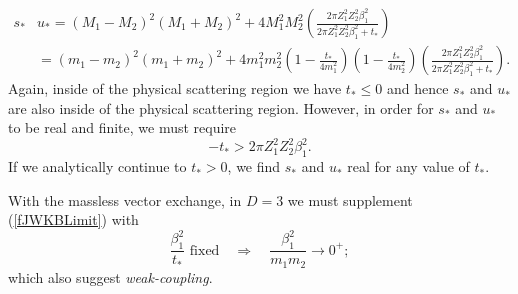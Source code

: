 \begin{align}
	s_{*}& u_{*} = (M_{1} - M_{2})^{2}(M_{1} + M_{2})^{2} + 4 M_{1}^{2} M_{2}^{2} \left( \frac{2 \pi Z_{1}^{2} Z_{2}^{2} \beta_{1}^{2}}{2 \pi Z_{1}^{2} Z_{2}^{2} \beta_{1}^{2} + t_{*}} \right) \nonumber \\
	&= (m_{1} - m_{2})^{2}(m_{1} + m_{2})^{2} + 4 m_{1}^{2} m_{2}^{2} \left(1 - \frac{t_{*}}{4 m_{1}^{2}} \right) \left(1 - \frac{t_{*}}{4 m_{2}^{2}} \right) \left( \frac{2 \pi Z_{1}^{2} Z_{2}^{2} \beta_{1}^{2}}{2 \pi Z_{1}^{2} Z_{2}^{2} \beta_{1}^{2} + t_{*}} \right).
\end{align}
Again, inside of the physical scattering region we have $t_{*} \leq 0$ and hence $s_{*}$ and $u_{*}$ are also inside of the physical scattering region. However, in order for $s_{*}$ and $u_{*}$ to be real and finite, we must require
\begin{equation}
	{-t_{*}} > 2 \pi Z_{1}^{2} Z_{2}^{2} \beta_{1}^{2}.
\end{equation}
If we analytically continue to $t_{*} > 0$, we find $s_{*}$ and $u_{*}$ real for any value of $t_{*}$.

With the massless vector exchange, in $D = 3$ we must supplement (\ref{fJWKBLimit}) with
\begin{equation}
	\frac{\beta_{1}^{2}}{t_{*}} \text{ fixed} \quad \Longrightarrow \quad \frac{\beta_{1}^{2}}{m_{1} m_{2}} \rightarrow 0^{+};
\end{equation}
which also suggest \textit{weak-coupling}.
